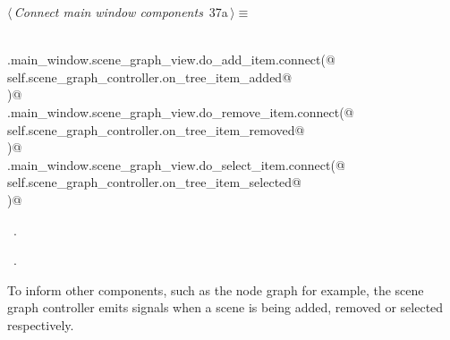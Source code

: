 \documentclass[
    a4paper,      %
    10pt,         %
    openright,    %
    notitlepage,  %
    parskip=half, %
]{scrreprt}       %
\theoremstyle{definition}                    %
\begin{document}
\begin{flushleft} \small
\begin{minipage}{\linewidth}\label{scrap44}\raggedright\small
{} $\langle\,${\itshape Connect main window components}\nobreak\ {\footnotesize {37a}}$\,\rangle\equiv$
\vspace{-1exm}
\begin{list}{}{} \item
\mbox{}\lstinline@@\\
\mbox{}\lstinline@self.main_window.scene_graph_view.do_add_item.connect(@\\
\mbox{}\lstinline@    self.scene_graph_controller.on_tree_item_added@\\
\mbox{}\lstinline@)@\\
\mbox{}\lstinline@self.main_window.scene_graph_view.do_remove_item.connect(@\\
\mbox{}\lstinline@    self.scene_graph_controller.on_tree_item_removed@\\
\mbox{}\lstinline@)@\\
\mbox{}\lstinline@self.main_window.scene_graph_view.do_select_item.connect(@\\
\mbox{}\lstinline@    self.scene_graph_controller.on_tree_item_selected@\\
\mbox{}\lstinline@)@{\NWsep}
\end{list}
\vspace{-1.5ex}
\footnotesize
\begin{list}{}{\setlength{\itemsep}{-\parsep}\setlength{\itemindent}{-\leftmargin}}
\item \NWtxtMacroDefBy\ .
\item \NWtxtMacroRefIn\ .

\item{}
\end{list}
\end{minipage}\vspace{4ex}
\end{flushleft}
To inform other components, such as the node graph for example, the scene graph
controller emits signals when a scene is being added, removed or selected
respectively.
\end{document}
